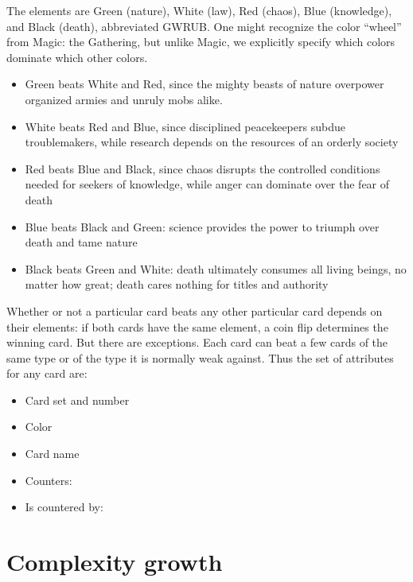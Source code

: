 \documentclass[11pt]{article}
\begin{document}
The elements are Green (nature), White (law), Red (chaos), Blue (knowledge), and Black (death),
abbreviated GWRUB.
One might recognize the color ``wheel'' from Magic: the Gathering,
but unlike Magic, we explicitly specify which colors dominate which other colors.
\begin{itemize}
\item Green beats White and Red, since the mighty beasts of nature overpower organized armies and unruly mobs alike.
\item White beats Red and Blue, since disciplined peacekeepers subdue troublemakers, while research depends on the resources of an orderly society
\item Red beats Blue and Black, since chaos disrupts the controlled conditions needed for seekers of knowledge, while anger can dominate over the fear of death
\item Blue beats Black and Green: science provides the power to triumph over death and tame nature
\item Black beats Green and White: death ultimately consumes all living beings, no matter how great; death cares nothing for titles and authority
\end{itemize}

Whether or not a particular card beats any other particular card depends on their elements: if both cards have the same element, a coin flip determines the winning card.
But there are exceptions.
Each card can beat a few cards of the same type or of the type it is normally weak against.
Thus the set of attributes for any card are:
\begin{itemize}
\item Card set and number
\item Color
\item Card name
\item Counters:
\item Is countered by:
\end{itemize}

\section{Complexity growth}
\end{document}
